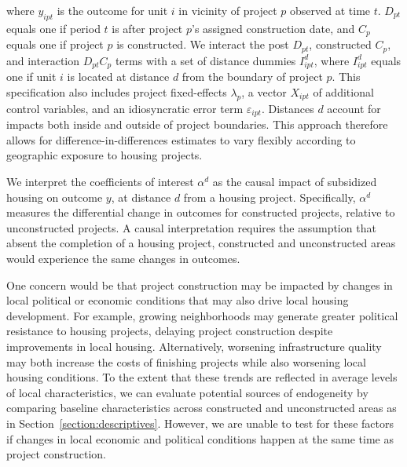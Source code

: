 \documentclass[12pt]{article}
\begin{document}
\noindent where $y_{ipt}$ is the outcome for unit $i$ in vicinity of project $p$ observed at time $t$. $D_{pt}$ equals one if period $t$ is after project $p$'s assigned construction date, and $C_{p}$ equals one if project $p$ is constructed. We interact the post $D_{pt}$, constructed $C_{p}$, and interaction $D_{pt}C_{p}$ terms with a set of distance dummies $I^d_{ipt}$, where $I^d_{ipt}$ equals one if unit $i$ is located at distance $d$ from the boundary of project $p$. This specification also includes project fixed-effects $\lambda_p$, a vector $X_{ipt}$ of additional control variables, and an idiosyncratic error term $\varepsilon_{ipt}$.  Distances $d$ account for impacts both inside and outside of project boundaries. This approach therefore allows for difference-in-differences estimates to vary flexibly according to geographic exposure to housing projects.

We interpret the coefficients of interest $\alpha^d$ as the causal impact of subsidized housing on outcome $y$, at distance $d$ from a housing project. Specifically, $\alpha^d$ measures the differential change in outcomes for constructed projects, relative to unconstructed projects.  A causal interpretation requires the assumption that absent the completion of a housing project, constructed and unconstructed areas would experience the same changes in outcomes.  

One concern would be that project construction may be impacted by changes in local political or economic conditions that may also drive local housing development.  For example, growing neighborhoods may generate greater political resistance to housing projects, delaying project construction despite improvements in local housing.  Alternatively, worsening infrastructure quality may both increase the costs of finishing projects while also worsening local housing conditions.  To the extent that these trends are reflected in average levels of local characteristics, we can evaluate potential sources of endogeneity by comparing baseline characteristics across constructed and unconstructed areas as in Section~\ref{section:descriptives}.  However, we are unable to test for these factors if changes in local economic and political conditions happen at the same time as project construction.
\end{document}
